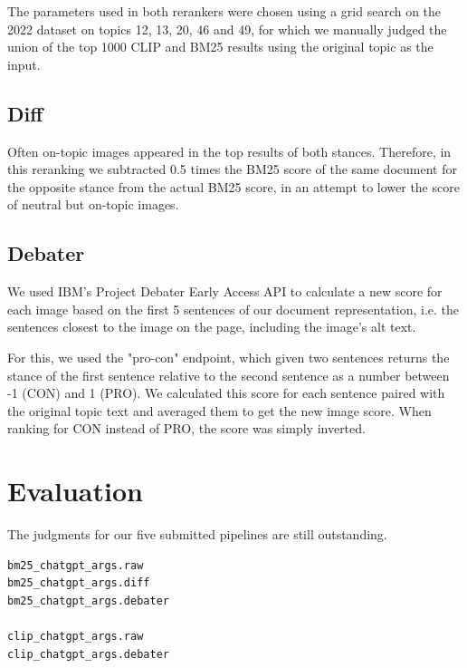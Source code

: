 \documentclass[
]{ceurart}
\begin{document}
The parameters used in both rerankers were chosen using a grid search on the 2022 dataset on topics 12, 13, 20, 46 and 49, for which we manually judged the union of the top 1000 CLIP and BM25 results using the original topic as the input.

\subsection{Diff}

Often on-topic images appeared in the top results of both stances. Therefore, in this reranking we subtracted 0.5 times the BM25 score of the same document for the opposite stance from the actual BM25 score, in an attempt to lower the score of neutral but on-topic images.

\subsection{Debater}

We used IBM's Project Debater Early Access API \cite{barhaim2021project} to calculate a new score for each image based on the first 5 sentences of our document representation, i.e. the sentences closest to the image on the page, including the image's alt text.

For this, we used the "pro-con" endpoint, which given two sentences returns the stance of the first sentence relative to the second sentence as a number between -1 (CON) and 1 (PRO). We calculated this score for each sentence paired with the original topic text and averaged them to get the new image score. When ranking for CON instead of PRO, the score was simply inverted.

\section{Evaluation}

The judgments for our five submitted pipelines are still outstanding.

\begin{verbatim}
bm25_chatgpt_args.raw
bm25_chatgpt_args.diff
bm25_chatgpt_args.debater

clip_chatgpt_args.raw
clip_chatgpt_args.debater
\end{verbatim}


\end{document}
